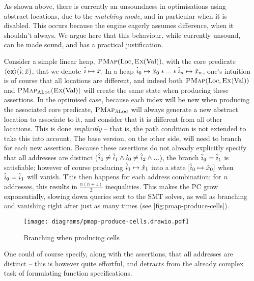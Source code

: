 As shown above, there is currently an unsoundness in optimisations using abstract locations, due to the \emph{matching mode}, and in particular when it is disabled. This occurs because the engine eagerly assumes difference, when it shouldn't always. We argue here that this behaviour, while currently unsound, can be made sound, and has a practical justification. 

Consider a simple linear heap, $\textsc{PMap}(\text{Loc}, \textsc{Ex}(\text{Val}))$, with the core predicate $\left<\texttt{ex}\right>\!(\hat{i};\hat{x})$, that we denote $\hat{i}\mapsto \hat{x}$. In a heap $\hat{i}_0\mapsto \hat{x}_0 * ... * \hat{i}_n\mapsto \hat{x}_n$, one's intuition is of course that all locations are different, and indeed both $\textsc{PMap}(\text{Loc}, \textsc{Ex}(\text{Val}))$ and $\textsc{PMap}_{\textsc{ALoc}}(\textsc{Ex}(\text{Val}))$ will create the same state when producing these assertions. In the optimised case, because each index will be new when producing the associated core predicate, $\textsc{PMap}_{\textsc{ALoc}}$ will always generate a new abstract location to associate to it, and consider that it is different from all other locations. This is done \emph{implicitly} -- that is, the path condition is not extended to take this into account. The base version, on the other side, will need to branch for each new assertion. Because these assertions do not already explicitly specify that all addresses are distinct (${\hat{i}_0 \neq \hat{i}_1 \land \hat{i}_0 \neq \hat{i}_2 \land ...}$), the branch $\hat{i}_0 = \hat{i}_1$ is satisfiable; however of course producing $\hat{i}_1 \mapsto \hat{x}_1$ into a state $[\hat{i}_0\mapsto \hat{x}_0]$ when $\hat{i}_0 = \hat{i}_1$ will vanish. This then happens for each address combination; for $n$ addresses, this results in $\frac{n(n+1)}{2}$ inequalities. This makes the PC grow exponentially, slowing down queries sent to the SMT solver, as well as branching and vanishing right after just as many times (see \autoref{fig:pmap-produce-cells}).

\begin{figure}
	\centering
	\texttt{[image: diagrams/pmap-produce-cells.drawio.pdf]}
	\caption{Branching when producing cells}
	\label{fig:pmap-produce-cells}
\end{figure}

One could of course specify, along with the assertions, that all addresses are distinct -- this is however quite effortful, and detracts from the already complex task of formulating function specifications.

